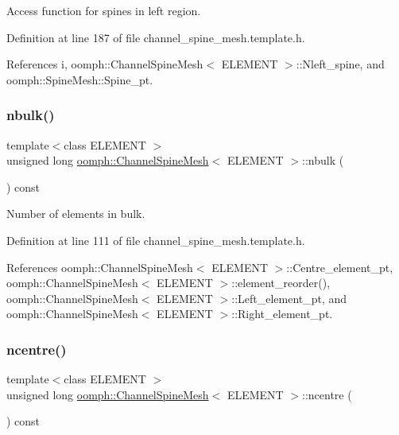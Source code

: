 Access function for spines in left region. 



Definition at line 187 of file channel\+\_\+spine\+\_\+mesh.\+template.\+h.



References i, oomph\+::\+Channel\+Spine\+Mesh$<$ E\+L\+E\+M\+E\+N\+T $>$\+::\+Nleft\+\_\+spine, and oomph\+::\+Spine\+Mesh\+::\+Spine\+\_\+pt.

\mbox{\label{classoomph_1_1ChannelSpineMesh_a89f5523009288ce87d2f0d1cbb9fb488}} 
\subsubsection{\texorpdfstring{nbulk()}{nbulk()}}
{\footnotesize\ttfamily template$<$class E\+L\+E\+M\+E\+NT $>$ \\
unsigned long \hyperlink{classoomph_1_1ChannelSpineMesh}{oomph\+::\+Channel\+Spine\+Mesh}$<$ E\+L\+E\+M\+E\+NT $>$\+::nbulk (\begin{DoxyParamCaption}{ }\end{DoxyParamCaption}) const\hspace{0.3cm}{\ttfamily [inline]}}



Number of elements in bulk. 



Definition at line 111 of file channel\+\_\+spine\+\_\+mesh.\+template.\+h.



References oomph\+::\+Channel\+Spine\+Mesh$<$ E\+L\+E\+M\+E\+N\+T $>$\+::\+Centre\+\_\+element\+\_\+pt, oomph\+::\+Channel\+Spine\+Mesh$<$ E\+L\+E\+M\+E\+N\+T $>$\+::element\+\_\+reorder(), oomph\+::\+Channel\+Spine\+Mesh$<$ E\+L\+E\+M\+E\+N\+T $>$\+::\+Left\+\_\+element\+\_\+pt, and oomph\+::\+Channel\+Spine\+Mesh$<$ E\+L\+E\+M\+E\+N\+T $>$\+::\+Right\+\_\+element\+\_\+pt.

\mbox{\label{classoomph_1_1ChannelSpineMesh_a422ed0d224b8da3c35732328e1aacdc0}} 
\subsubsection{\texorpdfstring{ncentre()}{ncentre()}}
{\footnotesize\ttfamily template$<$class E\+L\+E\+M\+E\+NT $>$ \\
unsigned long \hyperlink{classoomph_1_1ChannelSpineMesh}{oomph\+::\+Channel\+Spine\+Mesh}$<$ E\+L\+E\+M\+E\+NT $>$\+::ncentre (\begin{DoxyParamCaption}{ }\end{DoxyParamCaption}) const\hspace{0.3cm}{\ttfamily [inline]}}



